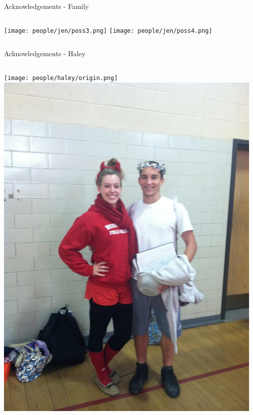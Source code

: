 \documentclass[aspectratio=169]{beamer}
\begin{document}
\begin{frame}{Acknowledgements - Family}
\begin{columns}
            \texttt{[image: people/jen/poss3.png]}
            \texttt{[image: people/jen/poss4.png]}
            
    \end{columns}
\end{frame}


\begin{frame}{Acknowledgements - Haley}
    \begin{columns}
            \texttt{[image: people/haley/origin.png]}
            \includegraphics[width=0.98\textwidth]{people/haley/angeldevil.png}

\end{columns}
\end{frame}
\end{document}
